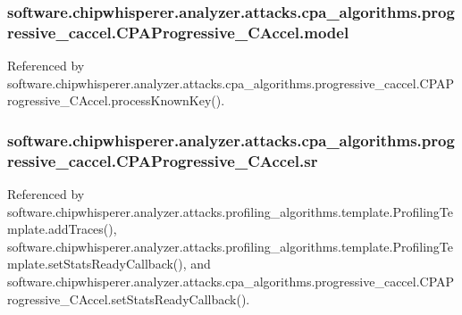 \subsubsection[{model}]{\setlength{\rightskip}{0pt plus 5cm}software.\+chipwhisperer.\+analyzer.\+attacks.\+cpa\+\_\+algorithms.\+progressive\+\_\+caccel.\+C\+P\+A\+Progressive\+\_\+\+C\+Accel.\+model}\label{classsoftware_1_1chipwhisperer_1_1analyzer_1_1attacks_1_1cpa__algorithms_1_1progressive__caccel_1_1CPAProgressive__CAccel_a964c4e82ecc2fddc3bdd7836ee1146fa}


Referenced by software.\+chipwhisperer.\+analyzer.\+attacks.\+cpa\+\_\+algorithms.\+progressive\+\_\+caccel.\+C\+P\+A\+Progressive\+\_\+\+C\+Accel.\+process\+Known\+Key().

\hypertarget{classsoftware_1_1chipwhisperer_1_1analyzer_1_1attacks_1_1cpa__algorithms_1_1progressive__caccel_1_1CPAProgressive__CAccel_a666be788c7eaea5a2be75912288d763e}{}
\subsubsection[{sr}]{\setlength{\rightskip}{0pt plus 5cm}software.\+chipwhisperer.\+analyzer.\+attacks.\+cpa\+\_\+algorithms.\+progressive\+\_\+caccel.\+C\+P\+A\+Progressive\+\_\+\+C\+Accel.\+sr}\label{classsoftware_1_1chipwhisperer_1_1analyzer_1_1attacks_1_1cpa__algorithms_1_1progressive__caccel_1_1CPAProgressive__CAccel_a666be788c7eaea5a2be75912288d763e}


Referenced by software.\+chipwhisperer.\+analyzer.\+attacks.\+profiling\+\_\+algorithms.\+template.\+Profiling\+Template.\+add\+Traces(), software.\+chipwhisperer.\+analyzer.\+attacks.\+profiling\+\_\+algorithms.\+template.\+Profiling\+Template.\+set\+Stats\+Ready\+Callback(), and software.\+chipwhisperer.\+analyzer.\+attacks.\+cpa\+\_\+algorithms.\+progressive\+\_\+caccel.\+C\+P\+A\+Progressive\+\_\+\+C\+Accel.\+set\+Stats\+Ready\+Callback().

